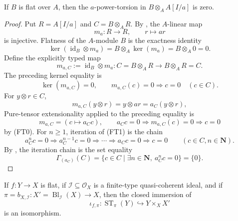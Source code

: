 \begin{lemma}
  \label{lemma:nagata-flat-strict-transform-no-torsion}
  \lean{}

  If $B$ is flat over $A$, then the $a$-power-torsion in
  $B\otimes_AA[I/a]$ is zero.
\end{lemma}

\begin{proof}
  Put $R=A[I/a]$ and $C=B\otimes_AR$.  By
  , the $A$-linear map
  \[
    m_a\colon R\to R,\qquad r\mapsto ar
  \]
  is injective.  Flatness of the $A$-module $B$ is the exactness identity
  \[
    \ker(\operatorname{id}_B\otimes m_a)
      =B\otimes_A\ker(m_a)=B\otimes_A0=0.
  \]
  Define the explicitly typed map
  \[
    m_{a,C}:=\operatorname{id}_B\otimes m_a\colon
      C=B\otimes_AR\longrightarrow B\otimes_AR=C.
  \]
  The preceding kernel equality is
  \[
    \ker(m_{a,C})=0,
    \qquad
    m_{a,C}(c)=0\Longrightarrow c=0\quad(c\in C).               \tag{FT0}
  \]
  For $y\otimes r\in C$,
  \[
    m_{a,C}(y\otimes r)
      =y\otimes ar
      =a_C(y\otimes r),
  \]
  Pure-tensor extensionality applied to the preceding equality is
  \[
    m_{a,C}=(c\mapsto a_Cc),\qquad
    a_Cc=0\Longrightarrow m_{a,C}(c)=0\Longrightarrow c=0       \tag{FT1}
  \]
  by (FT0).  For $n\geq1$, iteration of (FT1) is the chain
  \[
    a_C^nc=0
      \Longrightarrow a_C^{n-1}c=0
      \Longrightarrow\cdots\Longrightarrow a_Cc=0
      \Longrightarrow c=0
      \qquad(c\in C,n\in\mathbf N).
  \]
  By , the iteration chain is the set equality
  \[
    \Gamma_{(a_C)}(C)
      =\{c\in C\mid\exists n\in\mathbf N,\ a_C^nc=0\}
      =\{0\}.
  \]
\end{proof}

\begin{corollary}
  \label{cor:nagata-flat-strict-transform-base-change}
  \lean{}

  If $f\colon Y\to X$ is flat, if
  $\mathcal I\subseteq\mathcal O_X$ is a finite-type quasi-coherent ideal,
  and if
  $\pi=b_{X,\mathcal I}\colon X'=\operatorname{Bl}_{\mathcal I}(X)\to X$,
  then the closed immersion of 
  \[
    \iota_{f,\pi}\colon\operatorname{ST}_\pi(Y)\hookrightarrow Y\times_XX'
  \]
  is an isomorphism.
\end{corollary}

